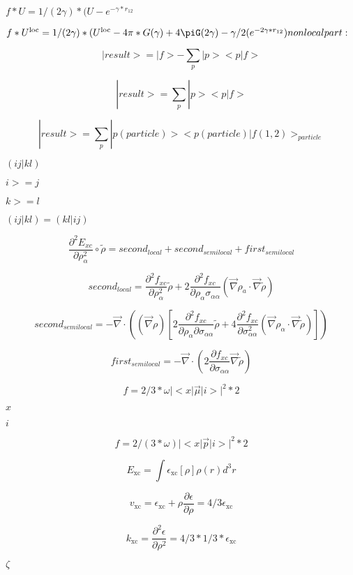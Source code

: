 \documentclass{article}
\begin{document}
$ f*U = 1/(2\gamma)*(U - e^{-\gamma*r_{12}} $
\pagebreak

$ f*U^{\text{loc}} = 1/(2\gamma)*(U^{\text{loc}} - 4\pi*G(\gamma) + 4\piG(2\gamma) - \gamma/2 (e^{-2\gamma*r_{12}} ) nonlocal part: $
\pagebreak

\[ |result> = |f> - \sum_p |p><p|f> \]
\pagebreak

\[ | result > = \sum_p | p > <p|f> \]
\pagebreak

\[ |result> = \sum_p |p(particle)> <p(particle)|f(1,2)>_{particle} \]
\pagebreak

$(ij|kl)$
\pagebreak

$i>=j$
\pagebreak

$k>=l$
\pagebreak

$(ij|kl)=(kl|ij)$
\pagebreak

\[ \frac{\partial^2E_{xc}}{\partial \rho_\alpha^2}\circ\tilde\rho = second_{local} + second_{semilocal} + first_{semilocal} \]
\pagebreak

\[ second_{local} = \frac{\partial^2 f_{xc}}{\partial \rho_\alpha^2}\tilde \rho + 2\frac{\partial^2 f_{xc}}{\partial \rho_\alpha\sigma_{\alpha\alpha}} \left(\vec\nabla \rho_a\cdot \vec \nabla\tilde\rho\right) \]
\pagebreak

\[ second_{semilocal} = -\vec\nabla\cdot\left((\vec\nabla\rho) \left[2\frac{\partial^2 f_{xc}}{\partial\rho_\alpha\partial\sigma_{\alpha\alpha}}\tilde\rho + 4\frac{\partial^2 f_{xc}}{\partial\sigma_{\alpha\alpha}^2} \left(\vec\nabla\rho_\alpha\cdot\vec\nabla\tilde\rho\right)\right]\right) \]
\pagebreak

\[ first_{semilocal} = -\vec\nabla\cdot\left(2\frac{\partial f_{xc}}{\partial\sigma_{\alpha\alpha}}\vec\nabla\tilde\rho\right) \]
\pagebreak

\[ f = 2/3 * \omega |<x | \vec \mu | i >| ^2 * 2 \]
\pagebreak

$ x $
\pagebreak

$ i $
\pagebreak

\[ f = 2/(3 * \omega) |<x | \vec p | i >| ^2 * 2 \]
\pagebreak

\[ E_\mathrm{xc} = \int\epsilon_\mathrm{xc}[\rho]\rho(r) d^3r \]
\pagebreak

\[ v_\mathrm{xc} = \epsilon_\mathrm{xc} + \rho\frac{\partial \epsilon}{\partial \rho} = 4/3\epsilon_\mathrm{xc} \]
\pagebreak

\[ k_\mathrm{xc} = \frac{\partial^2\epsilon}{\partial \rho^2} = 4/3*1/3 * \epsilon_\mathrm{xc} \]
\pagebreak

$ \zeta $
\pagebreak
\end{document}
